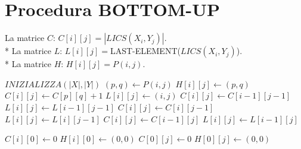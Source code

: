 \newpage

\section{Procedura BOTTOM-UP}

La matrice $C$: $C[i][j] = |LICS(X_i, Y_j)|$. \\*
La matrice $L$: $L[i][j] = $LAST-ELEMENT($LICS(X_i, Y_j)$). \\*
La matrice $H$: $H[i][j] = P(i,j)$. \\

\begin{algorithm}
    \begin{algorithmic}
            \State $INIZIALIZZA(|X|, |Y|)$
                        \State $(p, q) \gets P(i, j)$
                        \State $H[i][j] \gets (p, q)$
                            \State $C[i][j] \gets C[p][q] + 1$
                            \State $L[i][j] \gets (i,j)$
                        \Else
                            \State $C[i][j] \gets C[i-1][j-1]$
                            \State $L[i][j] \gets L[i-1][j-1]$
                        \EndIf
                    \Else
                            \State $C[i][j] \gets C[i][j-1]$
                            \State $L[i][j] \gets L[i][j-1]$
                        \Else
                            \State $C[i][j] \gets C[i-1][j]$
                            \State $L[i][j] \gets L[i-1][j]$
                        \EndIf
                    \EndIf
                \EndFor
            \EndFor
        \EndProcedure
    \end{algorithmic}
\end{algorithm}

\begin{algorithm}
    \begin{algorithmic}
                \State $C[i][0] \gets 0$
                \State $H[i][0] \gets (0,0)$
            \EndFor
                \State $C[0][j] \gets 0$
                \State $H[0][j] \gets (0,0)$
            \EndFor
        \EndProcedure
    \end{algorithmic}
\end{algorithm}

